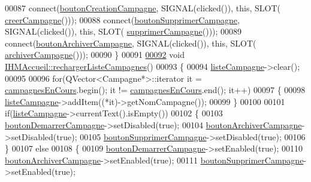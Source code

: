 \begin{DoxyCode}
00087     connect(\hyperlink{class_i_h_m_accueil_a4186b4ef6a9c63f5b3c6431626ff3268}{boutonCreationCampagne}, SIGNAL(clicked()), \textcolor{keyword}{this}, SLOT(
      \hyperlink{class_i_h_m_accueil_a1da45b17d6e4198f87a9a0e05d1f7fd5}{creerCampagne}()));
00088     connect(\hyperlink{class_i_h_m_accueil_afb409fb4395372f35f9f8699fcb4c89b}{boutonSupprimerCampagne}, SIGNAL(clicked()), \textcolor{keyword}{this}, SLOT(
      \hyperlink{class_i_h_m_accueil_a0d7c77277fe83ad13beee56d96c5c5ca}{supprimerCampagne}()));
00089     connect(\hyperlink{class_i_h_m_accueil_a96d64cf254c0645eb45c317858b0a0f3}{boutonArchiverCampagne}, SIGNAL(clicked()), \textcolor{keyword}{this}, SLOT(
      \hyperlink{class_i_h_m_accueil_a5d38917dbe88751ee966834e1f6c558e}{archiverCampagne}()));
00090 \}
00091 
\hyperlink{class_i_h_m_accueil_a44074f2d8d59e0d1b7a3d50c24d2a0df}{00092} \textcolor{keywordtype}{void} \hyperlink{class_i_h_m_accueil_a44074f2d8d59e0d1b7a3d50c24d2a0df}{IHMAccueil::rechargerListeCampagnes}()
00093 \{
00094     \hyperlink{class_i_h_m_accueil_afb828a4e06c25afa40341c310cd85b08}{listeCampagne}->clear();
00095 
00096     \textcolor{keywordflow}{for}(QVector<Campagne*>::iterator it = \hyperlink{class_i_h_m_accueil_ad3827b81480eb201b5927c16a2ad1c46}{campagnesEnCours}.begin(); it != 
      \hyperlink{class_i_h_m_accueil_ad3827b81480eb201b5927c16a2ad1c46}{campagnesEnCours}.end(); it++)
00097     \{
00098         \hyperlink{class_i_h_m_accueil_afb828a4e06c25afa40341c310cd85b08}{listeCampagne}->addItem((*it)->getNomCampagne());
00099     \}
00100 
00101     \textcolor{keywordflow}{if}(\hyperlink{class_i_h_m_accueil_afb828a4e06c25afa40341c310cd85b08}{listeCampagne}->currentText().isEmpty())
00102     \{
00103         \hyperlink{class_i_h_m_accueil_a9fd8ab3abc0c1e6addd70c8d7c46fb65}{boutonDemarrerCampagne}->setDisabled(\textcolor{keyword}{true});
00104         \hyperlink{class_i_h_m_accueil_a96d64cf254c0645eb45c317858b0a0f3}{boutonArchiverCampagne}->setDisabled(\textcolor{keyword}{true});
00105         \hyperlink{class_i_h_m_accueil_afb409fb4395372f35f9f8699fcb4c89b}{boutonSupprimerCampagne}->setDisabled(\textcolor{keyword}{true});
00106     \}
00107     \textcolor{keywordflow}{else}
00108     \{
00109         \hyperlink{class_i_h_m_accueil_a9fd8ab3abc0c1e6addd70c8d7c46fb65}{boutonDemarrerCampagne}->setEnabled(\textcolor{keyword}{true});
00110         \hyperlink{class_i_h_m_accueil_a96d64cf254c0645eb45c317858b0a0f3}{boutonArchiverCampagne}->setEnabled(\textcolor{keyword}{true});
00111         \hyperlink{class_i_h_m_accueil_afb409fb4395372f35f9f8699fcb4c89b}{boutonSupprimerCampagne}->setEnabled(\textcolor{keyword}{true});

\end{DoxyCode}
